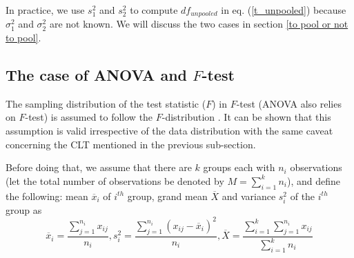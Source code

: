 \documentclass[10pt,final,Twcolumn]{IEEEtran}
\begin{document}
In practice, we use $s_1^2$ and $s_2^2$ to compute $df_{unpooled}$ in eq. (\ref{t_unpooled}) because $\sigma_1^2$ and $\sigma_2^2$ are not known. We will discuss the two cases in section \ref{to pool or not to pool}.

\subsection{The case of ANOVA and $F$-test}

The sampling distribution of the test statistic ($F$) in $F$-test (ANOVA also relies on $F$-test) is assumed to follow the $F$-distribution \cite{roussas2003introduction}. It can be shown that this assumption is valid irrespective of the data distribution with the same caveat concerning the CLT mentioned in the previous sub-section. 

Before doing that, we assume that there are $k$ groups each with $n_i$ observations (let the total number of observations be denoted by $M = \displaystyle\sum_{i=1}^{k}n_i$), and define the following: mean $\overline {x}_i$ of $i^{th}$ group, grand mean $\overline {X}$ and variance $s_i^2$ of the $i^{th}$ group as
\begin{equation} \label{eq:8}
\overline {x}_i = \frac{\displaystyle\sum_{j=1}^{n_i}x_{ij}}{n_i}, s_i^2 = \frac{\displaystyle\sum_{j=1}^{n_i}\left(x_{ij}-\overline {x}_i\right)^2}{n_i}, \overline {X} = \frac{\displaystyle\sum_{i=1}^{k}\displaystyle\sum_{j=1}^{n_i}x_{ij} }{\displaystyle\sum_{i=1}^{k}n_i} 
%
\end{equation}

\end{document}
